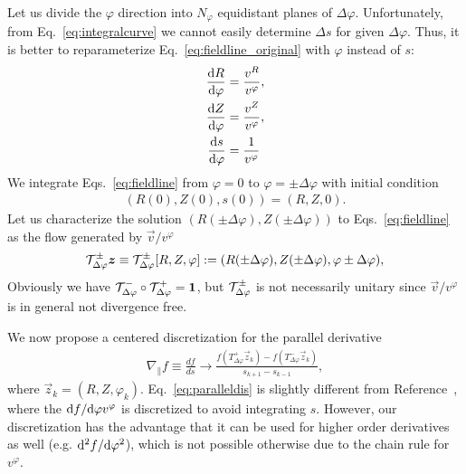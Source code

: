 Let us divide the $\varphi$ direction into $N_\varphi$ equidistant planes of
$\Delta \varphi$. Unfortunately, from Eq.~\eqref{eq:integralcurve} we cannot easily determine
$\Delta s$ for given $\Delta \varphi$.
Thus, it is better to reparameterize Eq.~\eqref{eq:fieldline_original} with $\varphi$ instead of $s$:
\begin{subequations}
\begin{align}
    \frac{\d R}{\d\varphi}&= \frac{v^R}{v^\varphi},\\ %
    \frac{\d Z}{\d\varphi}&=\frac{v^Z}{v^\varphi},\\%
    \frac{\d s}{\d\varphi}&=\frac{1}{v^\varphi}
\end{align}
\label{eq:fieldline}
\end{subequations}
We integrate Eqs.~\eqref{eq:fieldline} from $\varphi=0$ to $\varphi=\pm \Delta \varphi$
with initial condition
\begin{align}
    (R(0), Z(0), s(0) ) = (R, Z, 0).
    \label{}
\end{align}
Let us characterize the solution $(R(\pm \Delta \varphi), Z(\pm \Delta \varphi))$ to Eqs.~\eqref{eq:fieldline} as the flow generated by $\vec v/v^\varphi$
\begin{align}
    \mathcal T^\pm_{\Delta\varphi}{\boldsymbol{z}} \equiv \mathcal T^\pm_{\Delta\varphi}[R, Z, \varphi]:= ( R(\pm \Delta\varphi), Z( \pm \Delta\varphi), \varphi\pm\Delta \varphi),
    \label{}
\end{align}
Obviously we have $\mathcal T^-_{\Delta\varphi}\circ\mathcal T^+_{\Delta\varphi} = \mathbf{1}$, but $\mathcal T^\pm_{\Delta\varphi}$ is not necessarily unitary since $\vec v/v^\varphi$ is in general
not divergence free.

We now propose a centered discretization for the parallel derivative
\begin{align}
    \nabla_\parallel f \equiv \frac{df}{ds}
    \rightarrow \frac{f\left(T_{\Delta\varphi}^+\vec z_k\right)-f\left(T_{\Delta\varphi}^-\vec z_k\right)}{s_{k+1}-s_{k-1}},
  \label{eq:paralleldis}
\end{align}
where $\vec z_k = (R,Z,\varphi_k)$.
Eq.~\eqref{eq:paralleldis} is slightly different from Reference~\cite{Hariri2014}, where the $\mathrm{d} f/\mathrm{d}\varphi v^\varphi$ is discretized to avoid integrating $s$.
However, our discretization has the advantage that it can be used for higher
order derivatives as well (e.g. $\mathrm{d}^2f/\mathrm{d} \varphi^2$), which is not possible otherwise due to the chain rule
for $v^\varphi$.

